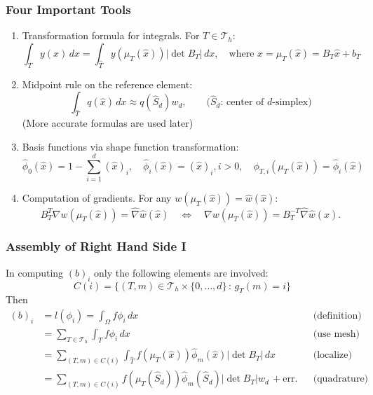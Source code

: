 \documentclass[aspectratio=169,11pt]{beamer}
\theoremstyle{definition}
\begin{document}
\begin{frame}
\frametitle{Four Important Tools}
\begin{enumerate}
\item Transformation formula for integrals. For $T\in\mathcal{T}_h$:
\begin{equation*}
\int_T y(x)\,dx = \int_{\hat T} y(\mu_T(\hat x)) |\det B_T| \,dx, \quad \text{where $x=\mu_T(\hat x) = B_T \hat x + b_T$}
\end{equation*}
\item Midpoint rule on the reference element:
\begin{equation*}
\int_{\hat T} q(\hat x) \,dx \approx q(\hat S_d) w_d, \qquad \text{($\hat S_d$: center of $d$-simplex)}
\end{equation*}
(More accurate formulas are used later)
\item Basis functions via shape function transformation:
\begin{equation*}
\hat\phi_0(\hat x) = 1-\sum_{i=1}^d (\hat x)_i, \quad
\hat\phi_i(\hat x) = (\hat x)_i, i>0, \quad
\phi_{T,i}(\mu_T(\hat x)) = \hat\phi_i(\hat x)
\end{equation*}
\item Computation of gradients. For any $w(\mu_T(\hat x)) = \hat w(\hat x)$:
\begin{equation*}
B_T^T \nabla w(\mu_T(\hat x)) = \hat\nabla \hat w(\hat x) \quad\Leftrightarrow\quad
\nabla w(\mu_T(\hat x)) = B_T^{-T}\hat\nabla \hat w(\hat x) .
\end{equation*}
\end{enumerate}
\end{frame}

\begin{frame}
\frametitle{Assembly of Right Hand Side I}
In computing $(b)_i$ only the following elements are involved:
$$C(i) = \{(T,m)\in\mathcal{T}_h\times\{0,\ldots,d\} \,:\, g_T(m)=i\}$$
Then
\begin{align*}
(b)_i &= l(\phi_i) = \int_\Omega f \phi_i\,dx &&\text{(definition)} \\
&= \sum_{T\in\mathcal{T}_h} \int_T f \phi_i\,dx &&\text{(use mesh)} \\
&= \sum_{(T,m)\in C(i)} \int_{\hat T} f(\mu_T(\hat x)) \hat\phi_m(\hat x) |\det B_T|\,dx
&&\text{(localize)} \\
&= \sum_{(T,m)\in C(i)}
f(\mu_T(\hat S_d)) \hat\phi_m(\hat S_d) |\det B_T| w_d \, + \text{err}. &&\text{(quadrature)}
\end{align*}
\end{frame}
\end{document}
